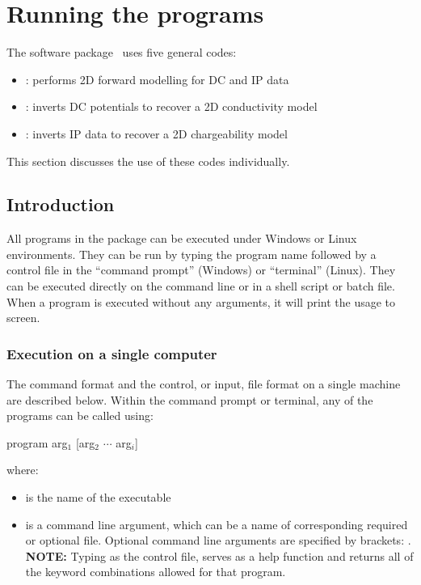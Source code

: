 \section{Running the programs}

The software package \programName~uses five general codes:
\begin{itemize}
\item {}: performs 2D forward modelling for DC and IP data
\item {}: inverts DC potentials to recover a 2D conductivity model
\item {}: inverts IP data to recover a 2D chargeability model
\end{itemize}
This section discusses the use of these codes individually.

\subsection{Introduction}
All programs in the package can be executed under Windows or Linux environments. They can be run by typing the program name followed by a control file in the ``command prompt'' (Windows) or ``terminal'' (Linux). They can be executed directly on the command line or in a shell script or batch file. When a program is executed without any arguments, it will print the usage to screen. 

\subsubsection{Execution on a single computer}
The command format and the control, or input, file format on a single machine are described below. Within the command prompt or terminal, any of the programs can be called using:
\begin{fileExample}
program arg$_1$ [arg$_2$ $\cdots$ arg$_i$]
\end{fileExample}
%
where:
\begin{itemize}
\item[\codeName{program}] is the name of the executable
\item[\codeName{arg$_i$}] is a command line argument, which can be a name of corresponding required or optional file. Optional command line arguments are specified by brackets: \codeName{[]}. \textbf{NOTE:} Typing  as the control file, serves as a help function and returns all of the keyword combinations allowed for that program.
\end{itemize}

